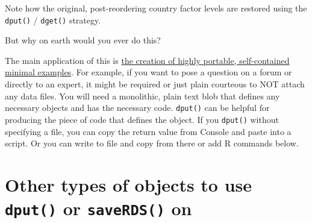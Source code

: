 \documentclass[
]{book}
\newenvironment{Shaded}{\begin{snugshade}}{\end{snugshade}}
\newcommand{\CommentTok}[1]{\textcolor[rgb]{0.56,0.35,0.01}{\textit{#1}}}
\newcommand{\DataTypeTok}[1]{\textcolor[rgb]{0.13,0.29,0.53}{#1}}
\newcommand{\KeywordTok}[1]{\textcolor[rgb]{0.13,0.29,0.53}{\textbf{#1}}}
\newcommand{\NormalTok}[1]{#1}
\newcommand{\OperatorTok}[1]{\textcolor[rgb]{0.81,0.36,0.00}{\textbf{#1}}}
\newcommand{\StringTok}[1]{\textcolor[rgb]{0.31,0.60,0.02}{#1}}
\begin{document}
\begin{Shaded}
\end{Shaded}

Note how the original, post-reordering country factor levels are restored using the \texttt{dput()} / \texttt{dget()} strategy.

But why on earth would you ever do this?

The main application of this is \href{https://stackoverflow.com/questions/5963269/how-to-make-a-great-r-reproducible-example}{the creation of highly portable, self-contained minimal examples}. For example, if you want to pose a question on a forum or directly to an expert, it might be required or just plain courteous to NOT attach any data files. You will need a monolithic, plain text blob that defines any necessary objects and has the necessary code. \texttt{dput()} can be helpful for producing the piece of code that defines the object. If you \texttt{dput()} without specifying a file, you can copy the return value from Console and paste into a script. Or you can write to file and copy from there or add R commands below.

\hypertarget{other-types-of-objects-to-use-dput-or-saverds-on}{%
\section{\texorpdfstring{Other types of objects to use \texttt{dput()} or \texttt{saveRDS()} on}{Other types of objects to use dput() or saveRDS() on}}\label{other-types-of-objects-to-use-dput-or-saverds-on}}
\end{document}
